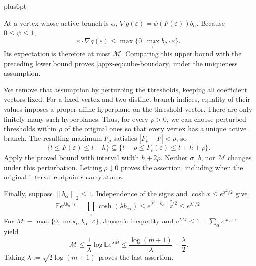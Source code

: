 \documentclass[11pt,letterpaper,twoside,leqno]{article}
\makeatletter
\theoremstyle{bookplain}
\theoremstyle{bookremark}
\renewenvironment{proof}[1][\proofname]{\par
  \pushQED{\qed}\normalfont\topsep6pt plus6pt\relax
  \trivlist\item[\hskip\labelsep\bfseries #1\@addpunct{.}]\ignorespaces
}{\popQED\endtrivlist\@endpefalse}
\newcommand{\E}{\mathbb E}
\newcommand{\norm}[1]{\left\lVert#1\right\rVert}
\makeatother
\begin{document}
\begin{proof}
At a vertex whose active branch is $\alpha$,
$\nabla g(\varepsilon)=\psi(F(\varepsilon))b_\alpha$.
Because $0\le\psi\le1$,
\[
 \varepsilon\cdot\nabla g(\varepsilon)
 \le\max\{0,\max_\beta b_\beta\cdot\varepsilon\}.
\]
Its expectation is therefore at most $\mathcal M$. Comparing
this upper bound with the preceding lower bound proves
\eqref{appx-eq:cube-boundary} under the uniqueness assumption.

We remove that assumption by perturbing the thresholds, keeping all
coefficient vectors fixed. For a fixed vertex and two distinct
branch indices, equality of their values imposes a proper affine
hyperplane on the threshold vector. There are only finitely many
such hyperplanes. Thus, for every $\rho>0$, we can choose perturbed
thresholds within $\rho$ of the original ones so that every vertex
has a unique active branch. The resulting maximum $F_\rho$ satisfies
$|F_\rho-F|<\rho$, so
\[
 \{t\le F(\varepsilon)\le t+h\}
 \subseteq
 \{t-\rho\le F_\rho(\varepsilon)\le t+h+\rho\}.
\]
Apply the proved bound with interval width $h+2\rho$.
Neither $\sigma$, $b$, nor $\mathcal M$ changes under this
perturbation. Letting $\rho\downarrow0$ proves the assertion,
including when the original interval endpoints carry atoms.

Finally, suppose $\norm{b_\alpha}_2\le1$. Independence of the
signs and $\cosh x\le e^{x^2/2}$ give
\[
 \E e^{\lambda b_\alpha\cdot\varepsilon}
 =\prod_i\cosh(\lambda b_{\alpha i})
 \le e^{\lambda^2\norm{b_\alpha}_2^2/2}
 \le e^{\lambda^2/2}.
\]
For $M:=\max\{0,\max_\alpha b_\alpha\cdot\varepsilon\}$,
Jensen's inequality and $e^{\lambda M}\le
1+\sum_\alpha e^{\lambda b_\alpha\cdot\varepsilon}$ yield
\[
 \mathcal M\le\frac1\lambda\log\E e^{\lambda M}
 \le\frac{\log(m+1)}\lambda+\frac\lambda2.
\]
Taking $\lambda:=\sqrt{2\log(m+1)}$ proves the last assertion.
\end{proof}
\end{document}
